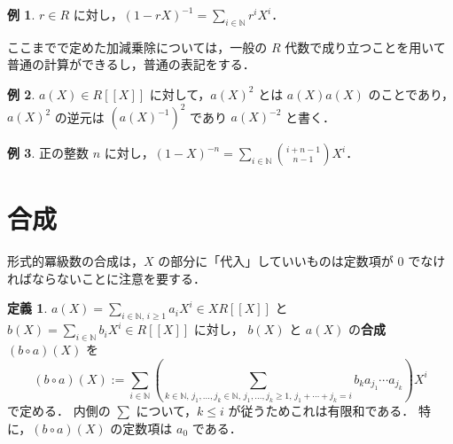 \documentclass{jsarticle}
\newcommand{\N}{\mathbb{N}}
\theoremstyle{definition}
\newtheorem*{Dfn}{定義}
\newtheorem*{Exm}{例}
\newenvironment{dfn}{\vspace{1ex}\begin{screen}\begin{Dfn}}{\end{Dfn}\end{screen}\vspace{1ex}}
\newenvironment{exm}{\begin{leftbar}\begin{Exm}}{\end{Exm}\end{leftbar}}
\begin{document}
\begin{exm}
  $r \in R$ に対し，$(1 - r X)^{-1} = \sum_{i\in\N} r^i X^i$．
\end{exm}

ここまでで定めた加減乗除については，一般の $R$ 代数で成り立つことを用いて普通の計算ができるし，普通の表記をする．

\begin{exm}
  $a(X) \in R[[X]]$ に対して，$a(X)^2$ とは $a(X) a(X)$ のことであり，
  $a(X)^2$ の逆元は $(a(X)^{-1})^2$ であり $a(X)^{-2}$ と書く．
\end{exm}

\begin{exm}
  正の整数 $n$ に対し，$(1 - X)^{-n} = \sum_{i\in\N} \binom{i+n-1}{n-1} X^i$．
\end{exm}


\section{合成}
形式的冪級数の合成は，$X$ の部分に「代入」していいものは定数項が $0$ でなければならないことに注意を要する．

\begin{dfn}
  $a(X) = \sum_{i\in\N,\,i\ge 1} a_i X^i \in X R[[X]]$ と
  $b(X) = \sum_{i\in\N} b_i X^i \in R[[X]]$ に対し，
  $b(X)$ と $a(X)$ の\textbf{合成} $(b \circ a)(X)$ を
  \[
    (b \circ a)(X) := \sum_{i\in\N} \left(\sum_{k\in\N,\, j_1,\ldots,j_k\in\N,\, j_1,\ldots,j_k\ge 1,\, j_1+\cdots+j_k=i} b_k a_{j_1} \cdots a_{j_k} \right) X^i
  \]
  で定める．
  内側の $\sum$ について，$k \le i$ が従うためこれは有限和である．
  特に，$(b \circ a)(X)$ の定数項は $a_0$ である．
\end{dfn}
\end{document}
